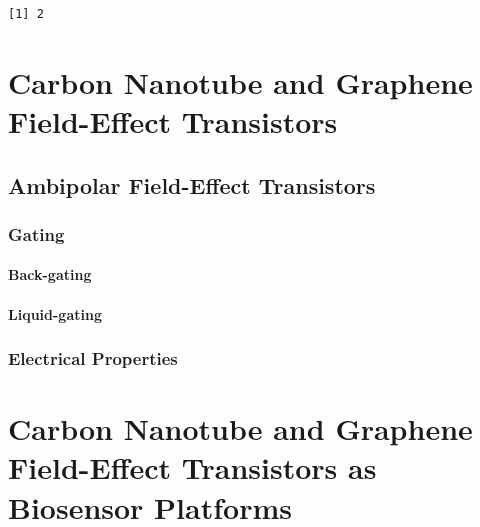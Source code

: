 \documentclass[
  a4paper,
]{scrbook}
\begin{document}
\begin{verbatim}
[1] 2
\end{verbatim}


\hypertarget{carbon-nanotube-and-graphene-field-effect-transistors}{%
\chapter{Carbon Nanotube and Graphene Field-Effect
Transistors}\label{carbon-nanotube-and-graphene-field-effect-transistors}}

\hypertarget{ambipolar-field-effect-transistors}{%
\section{Ambipolar Field-Effect
Transistors}\label{ambipolar-field-effect-transistors}}

\hypertarget{gating}{%
\subsection{Gating}\label{gating}}

\hypertarget{back-gating}{%
\subsubsection*{Back-gating}\label{back-gating}}

\hypertarget{liquid-gating}{%
\subsubsection*{Liquid-gating}\label{liquid-gating}}

\hypertarget{electrical-properties}{%
\subsection{Electrical Properties}\label{electrical-properties}}


\hypertarget{carbon-nanotube-and-graphene-field-effect-transistors-as-biosensor-platforms}{%
\chapter{Carbon Nanotube and Graphene Field-Effect Transistors as
Biosensor
Platforms}\label{carbon-nanotube-and-graphene-field-effect-transistors-as-biosensor-platforms}}
\end{document}
